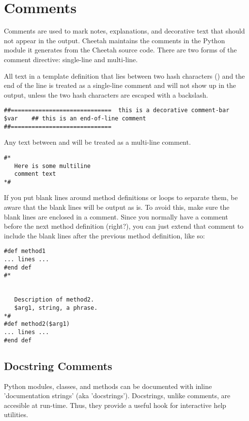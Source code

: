 \section{Comments}
\label{comments}

Comments are used to mark notes, explanations, and decorative text that should
not appear in the output.  Cheetah maintains the comments in the Python module
it generates from the Cheetah source code. There are two forms of the comment
directive: single-line and multi-line.

All text in a template definition that lies between two hash characters
(\code{\#\#}) and the end of the line is treated as a single-line comment and
will not show up in the output, unless the two hash characters are escaped with
a backslash.
\begin{verbatim}
##=============================  this is a decorative comment-bar
$var    ## this is an end-of-line comment
##=============================
\end{verbatim}

Any text between \code{\#*} and \code{*\#} will be treated as a multi-line
comment.
\begin{verbatim}
#*
   Here is some multiline
   comment text
*#
\end{verbatim}

If you put blank lines around method definitions or loops to separate them,
be aware that the blank lines will be output as is.  To avoid this, make sure
the blank lines are enclosed in a comment.  Since you normally have a
comment before the next method definition (right?), you can just extend that
comment to include the blank lines after the previous method definition, like
so:
\begin{verbatim}
#def method1
... lines ...
#end def
#*


   Description of method2.
   $arg1, string, a phrase.
*#
#def method2($arg1)
... lines ...
#end def
\end{verbatim}



\subsection{Docstring Comments}
\label{comments.docstring}

Python modules, classes, and methods can be documented with inline
'documentation strings' (aka 'docstrings').  Docstrings, unlike comments, are
accesible at run-time. Thus, they provide a useful hook for interactive help
utilities.  

